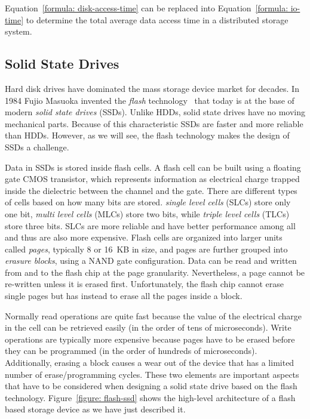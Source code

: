 Equation~\ref{formula: disk-access-time} can be replaced into Equation~\ref{formula: io-time} to determine the total average data access time in a distributed storage system.

\subsection{Solid State Drives}
Hard disk drives have dominated the mass storage device market for decades. In 1984 Fujio Masuoka invented the \textit{flash} technology~\cite{Masuoka1984} that today is at the base of modern \textit{solid state drives} (SSDs). Unlike HDDs, 
solid state drives have no moving mechanical parts. Because of this characteristic SSDs are faster and more reliable than HDDs. However, as we will see, the flash technology makes the design of SSDs a challenge.

Data in SSDs is stored inside flash cells. A flash cell can be built using a floating gate CMOS transistor, which represents information as electrical charge trapped inside the dielectric between the channel and the gate. There are 
different types of cells based on how many bits are stored. \textit{single level cells} (SLCs) store only one bit, \textit{multi level cells} (MLCs) store two bits, while \textit{triple level cells} (TLCs) store three bits. 
SLCs are more reliable and have better performance among all and thus are also more expensive. Flash cells are organized into larger units called \textit{pages}, typically 8 or 16~KB in size, and pages are further grouped 
into \textit{erasure blocks}, using a NAND gate configuration. Data can be read and written from and to the flash chip at the page granularity. Nevertheless, a page cannot be re-written unless it is erased first. Unfortunately, 
the flash chip cannot erase single pages but has instead to erase all the pages inside a block. %

Normally read operations are quite fast because the value of the electrical charge in the cell can be retrieved easily (in the order of tens of microseconds). Write operations are typically more expensive because pages 
have to be erased before they can be programmed (in the order of hundreds of microseconds). Additionally, erasing a block causes a wear out of the device that has a limited number of erase/programming cycles. These two 
elements are important aspects that have to be considered when designing a solid state drive based on the flash technology. Figure~\ref{figure: flash-ssd} shows the high-level architecture of a flash based storage device 
as we have just described it.

